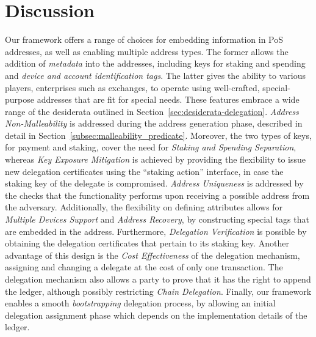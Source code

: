 \section{Discussion}\label{sec:future}

Our framework offers a range of choices for embedding information in PoS
addresses, as well as enabling multiple address types.  The former allows the
addition of \emph{metadata} into the addresses, including keys for staking and
spending and \emph{device and account identification tags}. The latter gives
the ability to various players, \eg enterprises such as exchanges, to operate
using well-crafted, special-purpose addresses that are fit for special needs.
These features embrace a wide range of the desiderata outlined in
Section~\ref{sec:desiderata-delegation}. \emph{Address Non-Malleability} is addressed
during the address generation phase, described in detail in
Section~\ref{subsec:malleability_predicate}. Moreover, the two types of keys,
for payment and staking, cover the need for \emph{Staking and Spending
Separation}, whereas \emph{Key Exposure Mitigation} is achieved by providing
the flexibility to issue new delegation certificates using the ``staking
action'' interface, in case the staking key of the delegate is compromised.
\emph{Address Uniqueness} is addressed by the checks that the functionality
performs upon receiving a possible address from the adversary. Additionally,
the flexibility on defining attributes allows for \emph{Multiple Devices
Support} and \emph{Address Recovery}, by constructing special tags that are
embedded in the address. Furthermore, \emph{Delegation Verification} is
possible by obtaining the delegation certificates that pertain to its staking
key. Another advantage of this design is the \emph{Cost Effectiveness} of the
delegation mechanism, assigning and changing a delegate at the cost of only one
transaction. The delegation mechanism also allows a party to prove that it has
the right to append the ledger, although possibly restricting \emph{Chain
Delegation}. Finally, our framework enables a smooth \emph{bootstrapping}
delegation process, by allowing an initial delegation assignment phase which
depends on the implementation details of the ledger.

